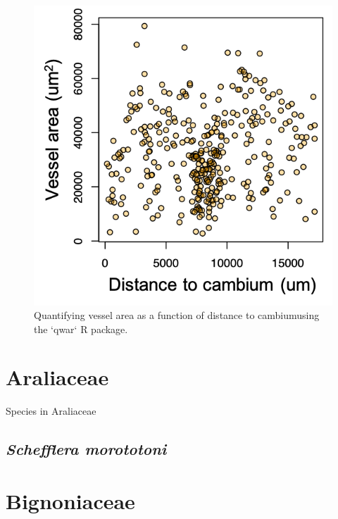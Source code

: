 \documentclass[
]{book}
\begin{document}
\begin{figure}

{\centering \includegraphics[width=7.75in,height=0.4\textheight]{images/Methods/r/graph} 

}

\caption{Quantifying vessel area as a function of distance to cambiumusing the `qwar` R package.}\label{fig:unnamed-chunk-7}
\end{figure}

\hypertarget{araliaceae}{%
\chapter{Araliaceae}\label{araliaceae}}

Species in Araliaceae

\hypertarget{schefflera-morototoni}{%
\section*{\texorpdfstring{\emph{Schefflera morototoni}}{Schefflera morototoni}}\label{schefflera-morototoni}}

\hypertarget{bignoniaceae}{%
\chapter{Bignoniaceae}\label{bignoniaceae}}
\end{document}
